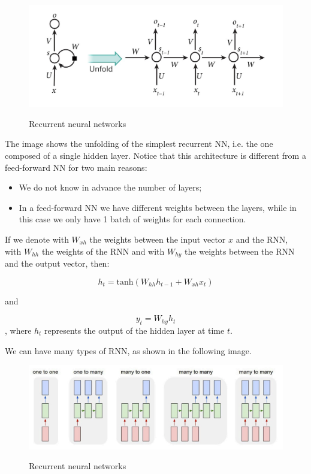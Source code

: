 \begin{figure}[h!]
		\centering
        \includegraphics[scale = 0.8]{img/rnn1.jpg}
		\label{mi}
        \caption{Recurrent neural networks}
\end{figure}

The image shows the unfolding of the simplest recurrent NN, i.e. the one composed of a single hidden layer. Notice that this architecture is different from a feed-forward NN for two main reasons:

\begin{itemize}
    \item We do not know in advance the number of layers;
    \item In a feed-forward NN we have different weights between the layers, while in this case we only have 1 batch of weights for each connection.
\end{itemize}

If we denote with $W_{xh}$ the weights between the input vector $x$ and the RNN, with $W_{hh}$ the weights of the RNN and with $W_{hy}$ the weights between the RNN and the output vector, then:

$$
h_t = \text{tanh} (W_{hh} h_{t-1} + W_{xh} x_t)
$$

and 

$$
y_t = W_{hy} h_t
$$
, where $h_t$ represents the output of the hidden layer at time $t$.

We can have many types of RNN, as shown in the following image.

\begin{figure}[h!]
		\centering
        \includegraphics[scale = 0.8]{img/rnn2.jpg}
		\label{mi}
        \caption{Recurrent neural networks}
\end{figure}

